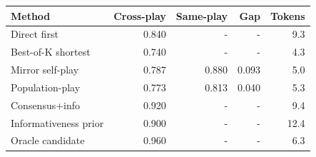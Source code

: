 \begin{tabular}{lrrrr}
\toprule
Method & Cross-play & Same-play & Gap & Tokens \\
\midrule
Direct first & 0.840 & - & - & 9.3 \\
Best-of-K shortest & 0.740 & - & - & 4.3 \\
Mirror self-play & 0.787 & 0.880 & 0.093 & 5.0 \\
Population-play & 0.773 & 0.813 & 0.040 & 5.3 \\
Consensus+info & 0.920 & - & - & 9.4 \\
Informativeness prior & 0.900 & - & - & 12.4 \\
Oracle candidate & 0.960 & - & - & 6.3 \\
\bottomrule
\end{tabular}
